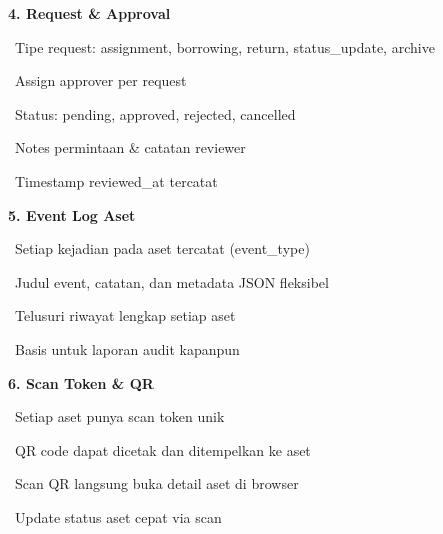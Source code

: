 \documentclass[a4paper]{article}
\begin{document}
\hfill%
\begin{minipage}[t]{0.485\textwidth}

    {\fontsize{10.5}{13}\selectfont\bfseries\color{TealPrimary} 4. Request \& Approval}
    \vspace{3pt}

    {\fontsize{9}{13}\selectfont\color{TextDark}%
    \textbullet\ Tipe request: assignment, borrowing, return, status\_update, archive\par\vspace{2pt}%
    \textbullet\ Assign approver per request\par\vspace{2pt}%
    \textbullet\ Status: pending, approved, rejected, cancelled\par\vspace{2pt}%
    \textbullet\ Notes permintaan \& catatan reviewer\par\vspace{2pt}%
    \textbullet\ Timestamp reviewed\_at tercatat}%
    \vspace{8pt}

    {\fontsize{10.5}{13}\selectfont\bfseries\color{TealPrimary} 5. Event Log Aset}
    \vspace{3pt}

    {\fontsize{9}{13}\selectfont\color{TextDark}%
    \textbullet\ Setiap kejadian pada aset tercatat (event\_type)\par\vspace{2pt}%
    \textbullet\ Judul event, catatan, dan metadata JSON fleksibel\par\vspace{2pt}%
    \textbullet\ Telusuri riwayat lengkap setiap aset\par\vspace{2pt}%
    \textbullet\ Basis untuk laporan audit kapanpun}%
    \vspace{8pt}

    {\fontsize{10.5}{13}\selectfont\bfseries\color{TealPrimary} 6. Scan Token \& QR}
    \vspace{3pt}

    {\fontsize{9}{13}\selectfont\color{TextDark}%
    \textbullet\ Setiap aset punya scan token unik\par\vspace{2pt}%
    \textbullet\ QR code dapat dicetak dan ditempelkan ke aset\par\vspace{2pt}%
    \textbullet\ Scan QR langsung buka detail aset di browser\par\vspace{2pt}%
    \textbullet\ Update status aset cepat via scan}%

\end{minipage}
\end{document}
